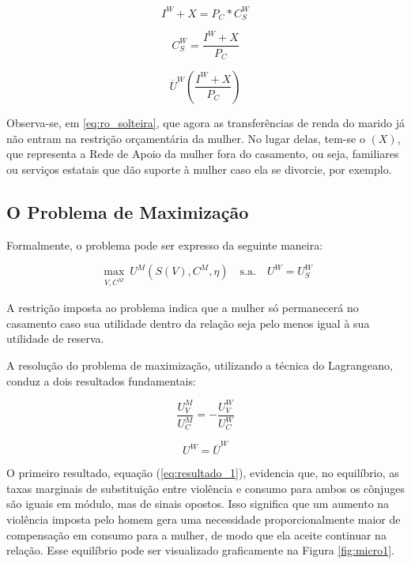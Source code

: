 \begin{equation}
    I^W + X = P_C * C_S^W
\label{eq:ro_solteira}
\end{equation}

\begin{equation}
C_S^W = \frac{I^W + X}{P_C}
\label{eq:ro_solteira_consumo}
\end{equation}

\begin{equation}
\overline{U}^W(\frac{I^W + X}{P_C})
\label{eq:ponto de ameaça}
\end{equation}

Observa-se, em \ref{eq:ro_solteira}, que agora as transferências de renda do marido já não entram na restrição orçamentária da mulher. No lugar delas, tem-se o $(X)$, que representa a Rede de Apoio da mulher fora do casamento, ou seja, familiares ou serviços estatais que dão suporte à mulher caso ela se divorcie, por exemplo. 



\subsection{O Problema de Maximização}

Formalmente, o problema pode ser expresso da seguinte maneira:

\begin{equation}
\max_{\substack{V, C^M}} U^M(S(V), C^M, \eta)
\quad \text{s.a.} \quad U^W=U_S^W
\label{eq:max}
\end{equation}


A restrição imposta ao problema indica que a mulher só permanecerá no casamento caso sua utilidade dentro da relação seja pelo menos igual à sua utilidade de reserva.

A resolução do problema de maximização, utilizando a técnica do Lagrangeano, conduz a dois resultados fundamentais:

\begin{equation}
\frac{U_V^M}{U_C^M} = -\frac{U_V^W}{U_C^W} 
\label{eq:resultado_1}
\end{equation}
 
\begin{equation}
U^W = \overline{U}^W
\label{eq:resultado_2}
\end{equation}

O primeiro resultado, equação (\ref{eq:resultado_1}), evidencia que, no equilíbrio, as taxas marginais de substituição entre violência e consumo para ambos os cônjuges são iguais em módulo, mas de sinais opostos. Isso significa que um aumento na violência imposta pelo homem gera uma necessidade proporcionalmente maior de compensação em consumo para a mulher, de modo que ela aceite continuar na relação. Esse equilíbrio pode ser visualizado graficamente na Figura \ref{fig:micro1}.

